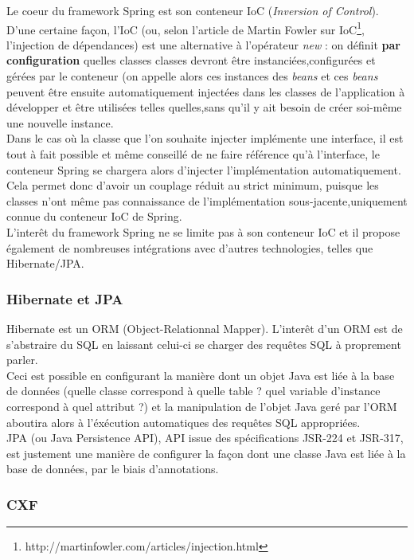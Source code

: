 Le coeur du framework Spring est son conteneur IoC (\textit{Inversion of Control}).
D'une certaine façon, l'IoC  (ou, selon l'article de Martin Fowler sur IoC\footnote{http://martinfowler.com/articles/injection.html}, l'injection de dépendances)  est une alternative à l'opérateur \textit{new} : on définit \textbf{par configuration} quelles classes classes devront être instanciées,configurées et gérées par le conteneur (on appelle alors ces instances des \textit{beans} et ces \textit{beans} peuvent être ensuite automatiquement \og injectées \fg{}  dans les classes de l'application à développer et être utilisées telles quelles,sans qu'il y ait besoin de créer soi-même une nouvelle instance.\\
Dans le cas où la classe que l'on souhaite injecter implémente une interface, il est tout à fait possible et même conseillé de ne faire référence qu'à l'interface, le conteneur Spring se chargera alors d'injecter l'implémentation automatiquement.
Cela permet donc d'avoir un couplage réduit au strict minimum, puisque les classes n'ont même pas connaissance de l'implémentation sous-jacente,uniquement connue du conteneur IoC de Spring.\\

L'interêt du framework Spring ne se limite pas à son conteneur IoC et il propose également de nombreuses intégrations avec d'autres technologies, telles que Hibernate/JPA. 

\subsubsection*{Hibernate et JPA}

Hibernate est un ORM (Object-Relationnal Mapper). L'interêt d'un ORM est de s'abstraire du SQL en laissant celui-ci se charger des requêtes SQL à proprement parler.\\
Ceci est possible en configurant la manière dont un objet Java est liée à la base de données (quelle classe correspond à quelle table ? quel variable d'instance correspond à quel attribut ?) et la manipulation de l'objet Java geré par l'ORM aboutira alors à l'éxécution automatiques des requêtes SQL appropriées.\\
JPA (ou Java Persistence API), API issue des spécifications JSR-224 et JSR-317, est justement une manière de configurer la façon dont une classe Java est liée à la base de données, par le biais d'annotations.

\subsubsection*{CXF}

